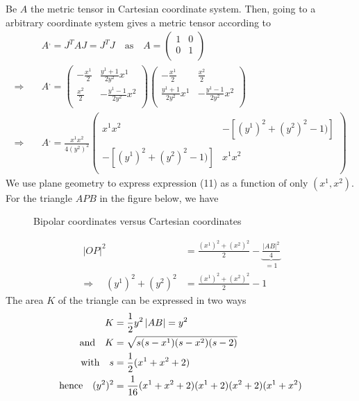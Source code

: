 \newpage
Be $A$ the metric tensor in Cartesian coordinate system. Then, going to a arbitrary coordinate system gives a metric tensor according to  
\begin{align}
\ & A^, = J^TAJ =J^TJ \quad \text{as}\quad A = \begin{pmatrix}
1 &0 \\
0& 1 \\
\end{pmatrix}\\
\Rightarrow\quad & A^, = \begin{pmatrix}
-\frac{x^1}{2} & \frac{y^1+1}{2y^2}x^1 \\
\frac{x^2}{2} & -\frac{y^1-1}{2y^2}x^2 \\
\end{pmatrix}\begin{pmatrix}
-\frac{x^1}{2} &\frac{x^2}{2}  \\
\frac{y^1+1}{2y^2}x^1 & -\frac{y^1-1}{2y^2}x^2 \\
\end{pmatrix}\\
\Rightarrow\quad & A^, =\frac{x^1x^2}{4(y^2)^2} \begin{pmatrix}
\ & \\
x^1x^2 &-\left[(y^1)^2 +(y^2)^2-1)\right] \\\\
-\left[(y^1)^2 +(y^2)^2-1)\right]  &x^1x^2\\
\ & 
\end{pmatrix}
\end{align}
We use plane geometry to express expression (11) as  a function of only $(x^1,x^2)$. For the triangle $APB$ in the figure below, we have
\begin{figure}[h]

\caption{Bipolar coordinates versus Cartesian coordinates}
\label{fig:fig_p79_260_b}
\end{figure}
\begin{align}
\ \left |  OP \right |^2 &= \frac{(x^1)^2+(x^2)^2}{2} - \underbrace{\frac{\left | AB \right|^2}{4}}_{=1}\\
\Rightarrow\quad (y^1)^2 +(y^2)^2 &= \frac{(x^1)^2+(x^2)^2}{2} - 1
\end{align}
The area $K$ of the triangle can be expressed in two ways
\begin{align}
\ K &= \frac{1}{2} y^2\left | AB \right| = y^2\\
\text{and} \quad K &= \sqrt{s(s-x^1)(s-x^2)(s-2)}\\
\text{with}\quad s &= \frac{1}{2} (x^1+x^2+2)\\
\text{hence}\quad (y^2)^2 &= \frac{1}{16}(x^1+x^2+2)(x^1+2)(x^2+2)(x^1+x^2)
\end{align}
